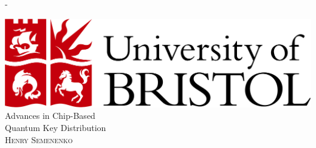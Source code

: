 %
%
% 
%
%
\begin{titlingpage}
\begin{SingleSpace}
\calccentering{\unitlength} 
\begin{adjustwidth*}{\unitlength}{-\unitlength}
\vspace*{0mm}
\begin{center}
\includegraphics[scale=0.2]{logos/bristollogo_colour}\\
\vspace{25mm}
{\HUGE Advances in Chip-Based\\Quantum Key Distribution }\\[4mm]
\vspace{30mm}
{\Large\textsc{Henry Semenenko}}\\

\end{center}
\end{adjustwidth*}
\end{SingleSpace}
\end{titlingpage}
